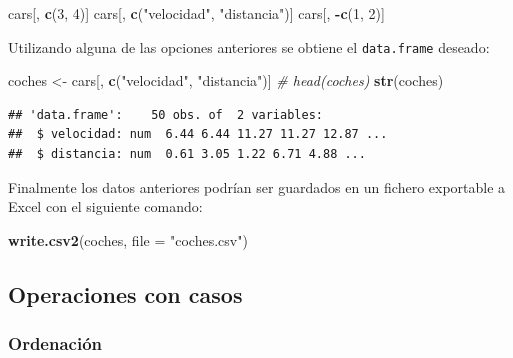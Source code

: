 \documentclass[]{book}
\newenvironment{Shaded}{\begin{snugshade}}{\end{snugshade}}
\newcommand{\CommentTok}[1]{\textcolor[rgb]{0.56,0.35,0.01}{\textit{#1}}}
\newcommand{\DataTypeTok}[1]{\textcolor[rgb]{0.13,0.29,0.53}{#1}}
\newcommand{\DecValTok}[1]{\textcolor[rgb]{0.00,0.00,0.81}{#1}}
\newcommand{\KeywordTok}[1]{\textcolor[rgb]{0.13,0.29,0.53}{\textbf{#1}}}
\newcommand{\NormalTok}[1]{#1}
\newcommand{\OperatorTok}[1]{\textcolor[rgb]{0.81,0.36,0.00}{\textbf{#1}}}
\newcommand{\StringTok}[1]{\textcolor[rgb]{0.31,0.60,0.02}{#1}}
\begin{document}
\begin{Shaded}
\begin{Highlighting}[]
\NormalTok{cars[, }\KeywordTok{c}\NormalTok{(}\DecValTok{3}\NormalTok{, }\DecValTok{4}\NormalTok{)]}
\NormalTok{cars[, }\KeywordTok{c}\NormalTok{(}\StringTok{"velocidad"}\NormalTok{, }\StringTok{"distancia"}\NormalTok{)]}
\NormalTok{cars[, }\OperatorTok{-}\KeywordTok{c}\NormalTok{(}\DecValTok{1}\NormalTok{, }\DecValTok{2}\NormalTok{)]}
\end{Highlighting}
\end{Shaded}

Utilizando alguna de las opciones anteriores se obtiene el \texttt{data.frame}
deseado:

\begin{Shaded}
\begin{Highlighting}[]
\NormalTok{coches <-}\StringTok{ }\NormalTok{cars[, }\KeywordTok{c}\NormalTok{(}\StringTok{"velocidad"}\NormalTok{, }\StringTok{"distancia"}\NormalTok{)]}
\CommentTok{# head(coches)}
\KeywordTok{str}\NormalTok{(coches)}
\end{Highlighting}
\end{Shaded}

\begin{verbatim}
## 'data.frame':    50 obs. of  2 variables:
##  $ velocidad: num  6.44 6.44 11.27 11.27 12.87 ...
##  $ distancia: num  0.61 3.05 1.22 6.71 4.88 ...
\end{verbatim}

Finalmente los datos anteriores podrían ser guardados en un fichero
exportable a Excel con el siguiente comando:

\begin{Shaded}
\begin{Highlighting}[]
\KeywordTok{write.csv2}\NormalTok{(coches, }\DataTypeTok{file =} \StringTok{"coches.csv"}\NormalTok{)}
\end{Highlighting}
\end{Shaded}

\hypertarget{operaciones-con-casos}{%
\subsection{Operaciones con casos}\label{operaciones-con-casos}}

\hypertarget{ordenacion}{%
\subsubsection{Ordenación}\label{ordenacion}}
\end{document}
